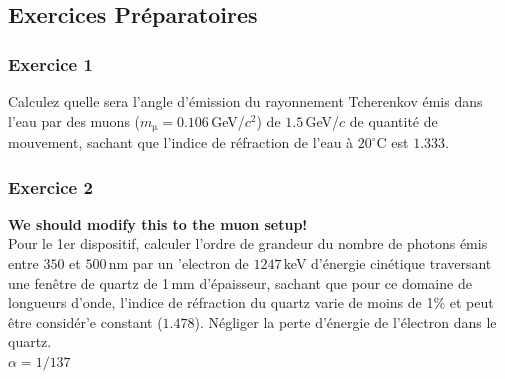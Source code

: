 \subsection{Exercices Pr\'eparatoires}

\subsubsection{Exercice 1}
Calculez quelle sera l'angle d'\'emission du rayonnement Tcherenkov \'emis dans l’eau par des muons ($m_\mathrm{\mu} = 0.106$\,GeV/$c^2$) de $1.5$\,GeV/$c$ de quantité de mouvement, sachant que l'indice de r\'efraction de l'eau \`a $20^\circ$C est $1.333$.


\subsubsection{Exercice 2}
\textbf{We should modify this to the muon setup!}\\
Pour le 1er dispositif, calculer l'ordre de grandeur du nombre de photons \'emis entre $350$ et $500$\,nm par un 'electron de $1247$\,keV d'\'energie cin\'etique traversant une fen\^etre de quartz de 1\,mm d'\'epaisseur, sachant que pour ce domaine de longueurs d’onde, l'indice de r\'efraction du quartz varie de moins de 1\% et peut \^etre consid\'er'e constant ($1.478$). N\'egliger la perte d'\'energie de l'\'electron dans le quartz.\\ $\alpha = 1/137$


